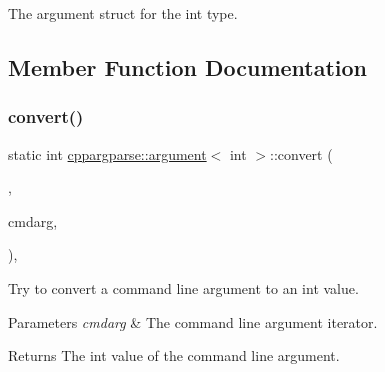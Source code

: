 The argument struct for the int type. 

\subsection{Member Function Documentation}
\mbox{\label{structcppargparse_1_1argument_3_01int_01_4_a0921c079e394b79f91bea0193786fa95}} 
\subsubsection{\texorpdfstring{convert()}{convert()}}
{\footnotesize\ttfamily static int \hyperlink{structcppargparse_1_1argument}{cppargparse\+::argument}$<$ int $>$\+::convert (\begin{DoxyParamCaption}\item[{const types\+::\+Command\+Line\+\_\+t \&}]{,  }\item[{const types\+::\+Command\+Line\+Argument\+\_\+t \&}]{cmdarg,  }\item[{const types\+::\+Command\+Line\+Arguments\+Map\+\_\+t \&}]{ }\end{DoxyParamCaption})\hspace{0.3cm}{\ttfamily [inline]}, {\ttfamily [static]}}



Try to convert a command line argument to an int value. 


\begin{DoxyParams}{Parameters}
{\em cmdarg} & The command line argument iterator.\\
\hline
\end{DoxyParams}
\begin{DoxyReturn}{Returns}
The int value of the command line argument. 
\end{DoxyReturn}
\mbox{\label{structcppargparse_1_1argument_3_01int_01_4_a6e26fa05cd9312bfc68889c9679a9908}} 
